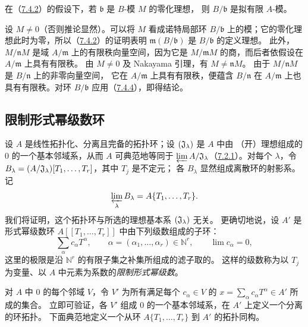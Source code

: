 在（\hyperlink{para:0:7.4.2}{7.4.2}）的假设下，若 $\mathfrak b$ 是 $B$-模 $M$ 的零化理想，
则 $B/\mathfrak b$ 是拟有限 $A$-模。

设 $M\ne0$（否则推论显然）。可以将 $M$ 看成诺特局部环 $B/\mathfrak b$
上的模；它的零化理想此时为零，所以（\hyperlink{para:0:7.4.2}{7.4.2}）的证明表明
$\mathfrak m(B/\mathfrak b)$ 是 $B/\mathfrak b$ 的定义理想。
此外，$M/\mathfrak nM$ 是域 $A/\mathfrak m$ 上的有限秩向量空间，因为它是
$M/\mathfrak mM$ 的商，而后者依假设在 $A/\mathfrak m$ 上具有有限秩。
由 $M\ne0$ 及 Nakayama 引理，有 $M\ne\mathfrak nM$。
由于 $M/\mathfrak nM$ 是 $B/\mathfrak n$ 上的非零向量空间，
它在 $A/\mathfrak m$ 上具有有限秩，便蕴含 $B/\mathfrak n$ 在
$A/\mathfrak m$ 上也具有有限秩。对环 $B/\mathfrak b$ 应用（\hyperlink{para:0:7.4.4}{7.4.4}），即得结论。



\par

\subsection{限制形式幂级数环}\hypertarget{heading:0:7.5}{}

设 $A$ 是线性拓扑化、分离且完备的拓扑环；设 $(\mathfrak J_\lambda)$ 是 $A$ 中由
（开）理想组成的 $0$ 的一个基本邻域系，从而 $A$ 可典范地等同于
$\varprojlim A/\mathfrak J_\lambda$（\hyperlink{para:0:7.2.1}{7.2.1}）。对每个 $\lambda$，令
$B_\lambda=(A/\mathfrak J_\lambda)[T_1,\ldots,T_r]$，其中 $T_j$ 是不定元；
各 $B_\lambda$ 显然组成离散环的射影系。记
\[
 \varprojlim_\lambda B_\lambda=A\{T_1,\ldots,T_r\}.
\]
我们将证明，这个拓扑环与所选的理想基本系 $(\mathfrak J_\lambda)$ 无关。
更确切地说，设 $A'$ 是形式幂级数环 $A[[T_1,\ldots,T_r]]$ 中由下列级数组成的子环：
\[
 \sum_{\alpha}c_\alpha T^\alpha,
 \qquad \alpha=(\alpha_1,\ldots,\alpha_r)\in\mathbb N^r,
 \qquad \lim c_\alpha=0,
\]
这里的极限是沿 $\mathbb N^r$ 的有限子集之补集所组成的滤子取的。
这样的级数称为以 $T_j$ 为变量、以 $A$ 中元素为系数的\emph{限制形式幂级数}。

对 $A$ 中 $0$ 的每个邻域 $V$，令 $V'$ 为所有满足每个 $c_\alpha\in V$ 的
$x=\sum_\alpha c_\alpha T^\alpha\in A'$ 所成的集合。
立即可验证，各 $V'$ 组成 $0$ 的一个基本邻域系，在 $A'$ 上定义一个分离的环拓扑。
下面典范地定义一个从环 $A\{T_1,\ldots,T_r\}$ 到 $A'$ 的拓扑同构。

